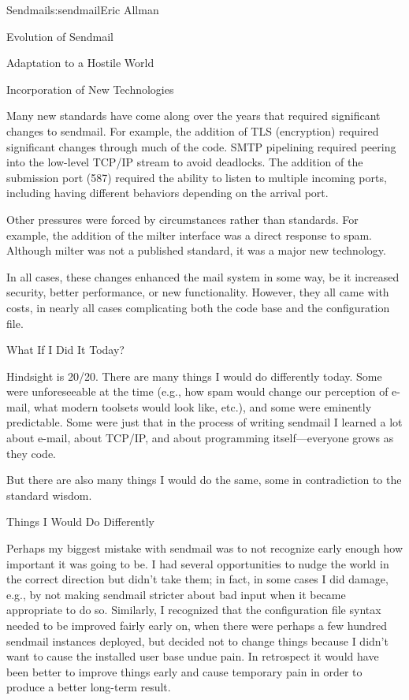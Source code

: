 \begin{aosachapter}{Sendmail}{s:sendmail}{Eric Allman}
\begin{aosasect1}{Evolution of Sendmail}
\begin{aosasect2}{Adaptation to a Hostile World}
\end{aosasect2}

\begin{aosasect2}{Incorporation of New Technologies}

Many new standards have come along over the years that required
significant changes to sendmail. For example, the addition of TLS
(encryption) required significant changes through much of the
code. SMTP pipelining required peering into the low-level TCP/IP
stream to avoid deadlocks. The addition of the submission port (587)
required the ability to listen to multiple incoming ports, including
having different behaviors depending on the arrival port.

Other pressures were forced by circumstances rather than standards.
For example, the addition of the milter interface was a direct
response to spam. Although milter was not a published standard, it was
a major new technology.

In all cases, these changes enhanced the mail system in some way, be
it increased security, better performance, or new
functionality. However, they all came with costs, in nearly all cases
complicating both the code base and the configuration file.

\end{aosasect2}

\end{aosasect1}

\begin{aosasect1}{What If I Did It Today?}

Hindsight is 20/20. There are many things I would do differently
today.  Some were unforeseeable at the time (e.g., how spam would
change our perception of e-mail, what modern toolsets would look like,
etc.), and some were eminently predictable. Some were just that in the
process of writing sendmail I learned a lot about e-mail, about TCP/IP,
and about programming itself---everyone grows as they code.

But there are also many things I would do the same, some in
contradiction to the standard wisdom.

\begin{aosasect2}{Things I Would Do Differently}

Perhaps my biggest mistake with sendmail was to not recognize early
enough how important it was going to be. I had several opportunities
to nudge the world in the correct direction but didn't take them; in
fact, in some cases I did damage, e.g., by not making sendmail
stricter about bad input when it became appropriate to do
so. Similarly, I recognized that the configuration file syntax needed
to be improved fairly early on, when there were perhaps a few hundred
sendmail instances deployed, but decided not to change things because
I didn't want to cause the installed user base undue pain. In
retrospect it would have been better to improve things early and
cause temporary pain in order to produce a better long-term result.


\end{aosasect2}
\end{aosasect1}
\end{aosachapter}
